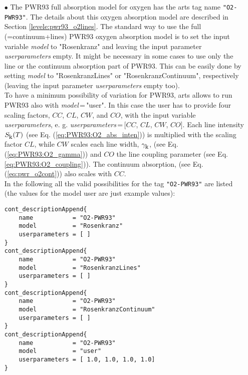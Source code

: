 \begin{itemize}
\item[$\bullet$] The PWR93 full absorption model for oxygen \citep{pwr:93}
     has the arts tag name {\tt "O2-PWR93"}. The details about this 
     oxygen absorption model are described in Section \ref{levele:pwr93_o2lines}. 
     The standard way to use the full (=continuum+lines) PWR93 oxygen 
     absorption model is to set the input variable {\it model} 
     to "Rosenkranz" and leaving the input parameter {\it userparameters} empty. 
     It might be necessary in some cases to use only the line or the 
     continuum absorption part of PWR93. This can be easily done 
     by setting {\it model} to "RosenkranzLines" or "RosenkranzContinuum", 
     respectively (leaving the input parameter {\it userparameters} 
     empty too).\\ To have a minimum possibility of variation for PWR93, 
     arts allows to run PWR93 also with {\it model}\,=\,"user". 
     In this case the user has to provide four scaling factors,  
     $CC$, $CL$, $CW$, and $CO$, with the input variable {\it userparameters}, 
     e. g. {\it userparameters}\,=\,$[$$CC$, $CL$, $CW$, $CO$$]$. 
     Each line intensity $S_{\mbox{\rm \small k}}(T)$ (see Eq. (\ref{eq:PWR93:O2_abs_inten})) 
     is multiplied with the scaling factor $CL$, while $CW$ scales 
     each line width, $\gamma_{\mbox{\rm \small k}}$, (see Eq. (\ref{eq:PWR93:O2_gamma})) and 
     $CO$ the line coupling parameter (see Eq. \ref{eq:PWR93:O2_coupling})). 
     The continuum absorption, (see Eq. (\ref{eq:pwr_o2cont})) 
     also scales with $CC$.\\
     In the following all the valid possibilities for the
     tag {\tt "O2-PWR93"} are listed (the values for the 
     model user are just example values):
\begin{verbatim}
cont_descriptionAppend{
    name           = "O2-PWR93"
    model          = "Rosenkranz"
    userparameters = [ ]
}
cont_descriptionAppend{
    name           = "O2-PWR93"
    model          = "RosenkranzLines"
    userparameters = [ ]
}
cont_descriptionAppend{
    name           = "O2-PWR93"
    model          = "RosenkranzContinuum"
    userparameters = [ ]
}
cont_descriptionAppend{
    name           = "O2-PWR93"
    model          = "user"
    userparameters = [ 1.0, 1.0, 1.0, 1.0]
}
\end{verbatim}
\end{itemize}

